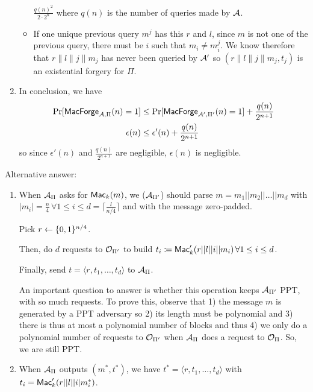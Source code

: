 \begin{solution}
\begin{enumerate}
\begin{itemize}
			$\frac{q(n)^2}{2 \cdot 2^n}$ where $q(n)$ is the number of queries made by $\mathcal{A}$.
			\item
			If one unique previous query $m^j$ has this $r$ and $l$, since $m$ is not one of the previous query, there must be $i$
			such that $m_i \neq m_i^j$.
			We know therefore that $r\|l\|j\|m_j$ has never been queried by $\mathcal{A}'$ so $(r\|l\|j\|m_j, t_j)$ is an existential forgery for $\Pi$.
		\end{itemize}
		\item In conclusion, we have
		\begin{align*}
			\Pr[\mathsf{MacForge}_{\mathcal{A},\Pi}(n) = 1]
			& \leq \Pr[\mathsf{MacForge}_{\mathcal{A}',\Pi'}(n) = 1] + \frac{q(n)}{2^{n+1}}\\
			\epsilon(n)
			& \leq \epsilon'(n) + \frac{q(n)}{2^{n+1}}
		\end{align*}
		so since $\epsilon'(n)$ and $\frac{q(n)}{2^{n+1}}$ are negligible,
		$\epsilon(n)$ is negligible.
	\end{enumerate}

	Alternative answer:
	\begin{enumerate}[start=2]
		\item When $\mathcal{A}_\Pi$ asks for $\operatorname{\mathsf{Mac}}_k(m)$, we ($\mathcal{A}_{\Pi'}$) should parse $m=m_1||m_2||\dots||m_d$ with $|m_i|=\frac{n}{4} \, \forall 1\le i \le d=\lceil \frac{l}{n/4}\rceil$ and with the message zero-padded.

		Pick $r \leftarrow \{0, 1\}^{n/4}$.

		Then, do $d$ requests to $\mathcal{O}_{\Pi'}$ to build $t_i \coloneqq \operatorname{\mathsf{Mac}}'_k(r||l||i||m_i) \, \forall 1 \le i \le d$.

		Finally, send $t=\langle r, t_1, \dots, t_d\rangle$ to $\mathcal{A}_\Pi$.

		An important question to answer is whether this operation keeps $\mathcal{A}_{\Pi'}$ PPT, with so much requests. To prove this, observe that 1) the message $m$ is generated by a PPT adversary so 2) its length must be polynomial and 3) there is thus at most a polynomial number of blocks and thus 4) we only do a polynomial number of requests to $\mathcal{O}_{\Pi'}$ when $\mathcal{A}_\Pi$ does a request to $\mathcal{O}_\Pi$. So, we are still PPT.

		\item When $\mathcal{A}_\Pi$ outputs $(m^*, t^*)$, we have $t^*=\langle r, t_1, \dots, t_d\rangle$ with $t_i=\operatorname{\mathsf{Mac}}'_k(r||l||i|m_i^*)$.


\end{enumerate}
\end{solution}
